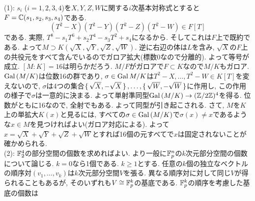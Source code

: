 \begin{egans}
{\small
(1): $s_i$ ($i=1,2,3,4$)を$X,Y,Z,W$に関する$i$次基本対称式とすると$F=\mathbb{C}(s_1,s_2,s_3,s_4)$である.
\[(T^2 - X)(T^2-Y)(T^2-Z)(T^2-W) \in F[T]\]
である. 実際, $T^8 - s_1T^6 + s_2T^4 -s_3 T^2 + s_4 $になるから. そしてこれは$F$上で既約である.
{\small
{}
}
よって$M\supset K(\sqrt{X},\sqrt{Y},\sqrt{Z},\sqrt{W})$. 逆に右辺の体は$L$を含み, $\sqrt{X}$の$F$上の共役元をすべて含んでいるのでガロア拡大(標数0なので分離的). よって等号が成立. $[M:K] = 16$は明らかだろう. $M/F$がガロアで$F\subset K$なので$M/K$もガロア. $\operatorname{Gal}{(M/K)}$は位数16の群であり, $\sigma\in \operatorname{Gal}{M/K}$は$T^2-X,\dots, T^2-W\in K[T]$を変えないので, $\sigma$は4つの集合$\set{\sqrt{X},-\sqrt{X}},\dots, \set{\sqrt{W}, -\sqrt{W}}$に作用し, この作用の様子で$\sigma$は一意的に決まる. よって単射準同型$\operatorname{Gal}{(M/K)} \to (\mathbb{Z}/2\mathbb{Z})^4$を得る. 位数がともに16なので, 全射でもある. よって同型が引き起こされる. さて, $M$を$K$上の単拡大$K(x)$と見るには, すべての$\sigma\in \operatorname{Gal}{(M/K)}$で$\sigma(x)\neq x$であるような$x\in M$を見つければよい(ガロア対応による). よって$x=\sqrt{X} + \sqrt{Y} + \sqrt{Z} + \sqrt{W}$とすれば16個の元すべてで$x$は固定されないことが確かめられる. \\
(2): $\mathbb{F}_{2}^4$の部分空間の個数を求めればよい. より一般に$\mathbb{F}_{p}^n$の$k$次元部分空間の個数について論じる. $k=0$なら1個である. $k\geq 1$とする.  任意の$k$個の独立なベクトルの順序対$(v_1,\dots, v_k)$は$k$次元部分空間$V$を張る. 異なる順序対に対して同じ$V$が得られることもあるが, そのいずれも$V\cong \mathbb{F}_{p}^{k}$の基底である. $\mathbb{F}_{p}^{k}$の順序を考慮した基底の個数は
}
\end{egans}
